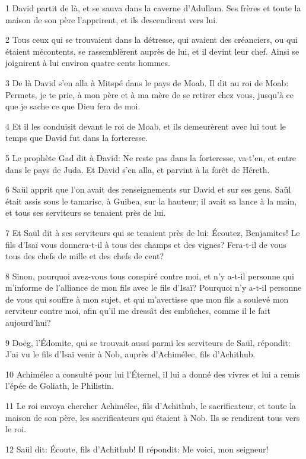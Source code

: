 \par 1 David partit de là, et se sauva dans la caverne d'Adullam. Ses frères et toute la maison de son père l'apprirent, et ils descendirent vers lui.
\par 2 Tous ceux qui se trouvaient dans la détresse, qui avaient des créanciers, ou qui étaient mécontents, se rassemblèrent auprès de lui, et il devint leur chef. Ainsi se joignirent à lui environ quatre cents hommes.
\par 3 De là David s'en alla à Mitspé dans le pays de Moab. Il dit au roi de Moab: Permets, je te prie, à mon père et à ma mère de se retirer chez vous, jusqu'à ce que je sache ce que Dieu fera de moi.
\par 4 Et il les conduisit devant le roi de Moab, et ils demeurèrent avec lui tout le temps que David fut dans la forteresse.
\par 5 Le prophète Gad dit à David: Ne reste pas dans la forteresse, va-t'en, et entre dans le pays de Juda. Et David s'en alla, et parvint à la forêt de Héreth.
\par 6 Saül apprit que l'on avait des renseignements sur David et sur ses gens. Saül était assis sous le tamarisc, à Guibea, sur la hauteur; il avait sa lance à la main, et tous ses serviteurs se tenaient près de lui.
\par 7 Et Saül dit à ses serviteurs qui se tenaient près de lui: Écoutez, Benjamites! Le fils d'Isaï vous donnera-t-il à tous des champs et des vignes? Fera-t-il de vous tous des chefs de mille et des chefs de cent?
\par 8 Sinon, pourquoi avez-vous tous conspiré contre moi, et n'y a-t-il personne qui m'informe de l'alliance de mon fils avec le fils d'Isaï? Pourquoi n'y a-t-il personne de vous qui souffre à mon sujet, et qui m'avertisse que mon fils a soulevé mon serviteur contre moi, afin qu'il me dressât des embûches, comme il le fait aujourd'hui?
\par 9 Doëg, l'Édomite, qui se trouvait aussi parmi les serviteurs de Saül, répondit: J'ai vu le fils d'Isaï venir à Nob, auprès d'Achimélec, fils d'Achithub.
\par 10 Achimélec a consulté pour lui l'Éternel, il lui a donné des vivres et lui a remis l'épée de Goliath, le Philistin.
\par 11 Le roi envoya chercher Achimélec, fils d'Achithub, le sacrificateur, et toute la maison de son père, les sacrificateurs qui étaient à Nob. Ils se rendirent tous vers le roi.
\par 12 Saül dit: Écoute, fils d'Achithub! Il répondit: Me voici, mon seigneur!

